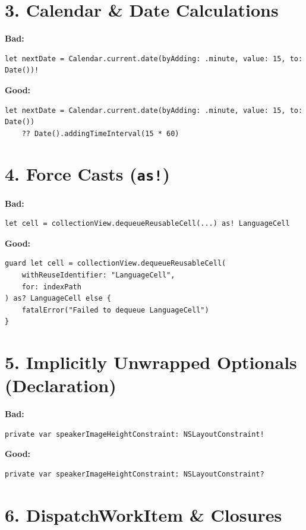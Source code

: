 \documentclass[11pt,a4paper]{article}
\begin{document}
\section{3. Calendar \& Date Calculations}

\textbf{Bad:}
\begin{lstlisting}
let nextDate = Calendar.current.date(byAdding: .minute, value: 15, to: Date())!
\end{lstlisting}

\textbf{Good:}
\begin{lstlisting}
let nextDate = Calendar.current.date(byAdding: .minute, value: 15, to: Date())
    ?? Date().addingTimeInterval(15 * 60)
\end{lstlisting}

\section{4. Force Casts (\texttt{as!})}

\textbf{Bad:}
\begin{lstlisting}
let cell = collectionView.dequeueReusableCell(...) as! LanguageCell
\end{lstlisting}

\textbf{Good:}
\begin{lstlisting}
guard let cell = collectionView.dequeueReusableCell(
    withReuseIdentifier: "LanguageCell", 
    for: indexPath
) as? LanguageCell else {
    fatalError("Failed to dequeue LanguageCell")
}
\end{lstlisting}

\section{5. Implicitly Unwrapped Optionals (Declaration)}

\textbf{Bad:}
\begin{lstlisting}
private var speakerImageHeightConstraint: NSLayoutConstraint!
\end{lstlisting}

\textbf{Good:}
\begin{lstlisting}
private var speakerImageHeightConstraint: NSLayoutConstraint?
\end{lstlisting}

\section{6. DispatchWorkItem \& Closures}
\end{document}
